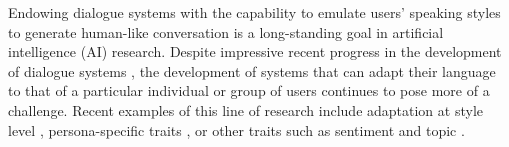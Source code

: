 

Endowing dialogue systems with the capability to emulate users' speaking styles to generate human-like conversation is a long-standing goal in artificial intelligence (AI) research. 
Despite impressive recent progress in the development of dialogue systems \citep{mctear2020conversational}, the development of systems that can adapt their language to that of a particular individual or group of users continues to pose more of a challenge.
Recent examples of this line of research include adaptation at style level \citep{ficler-goldberg-2017-controlling}, persona-specific traits \citep{zhang-etal-2018-personalizing}, or other traits such as sentiment and topic \citep{madotto-etal-2020-plug}.

